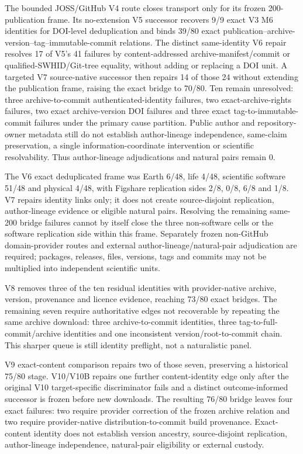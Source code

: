 The bounded JOSS/GitHub V4 route closes transport only for its frozen
200-publication frame. Its no-extension V5 successor recovers 9/9 exact V3 M6
identities for DOI-level deduplication and binds 39/80 exact
publication--archive-version--tag--immutable-commit relations. The distinct
same-identity V6 repair resolves 17 of V5's 41 failures by content-addressed
archive-manifest/commit or qualified-SWHID/Git-tree equality, without adding or
replacing a DOI unit. A targeted V7 source-native successor then repairs 14 of
those 24 without extending the publication frame, raising the exact bridge to
70/80. Ten remain unresolved: three archive-to-commit authenticated-identity
failures, two exact-archive-rights failures, two exact archive-version DOI
failures and three exact tag-to-immutable-commit failures under the primary
cause partition. Public author and repository-owner metadata still do not
establish author-lineage independence, same-claim preservation, a single
information-coordinate intervention or scientific resolvability. Thus
author-lineage adjudications and natural pairs remain 0.

The V6 exact deduplicated frame was Earth 6/48, life 4/48, scientific software
51/48 and physical 4/48, with Figshare replication sides 2/8, 0/8, 6/8 and
1/8. V7 repairs identity links only; it does not create source-disjoint
replication, author-lineage evidence or eligible natural pairs. Resolving the
remaining same-200 bridge failures cannot by itself close the three
non-software cells or the software replication side within this frame.
Separately frozen non-GitHub domain-provider
routes and external author-lineage/natural-pair adjudication are required;
packages, releases, files, versions, tags and commits may not be multiplied
into independent scientific units.

V8 removes three of the ten residual identities with provider-native archive,
version, provenance and licence evidence, reaching 73/80 exact bridges. The
remaining seven require authoritative edges not recoverable by repeating the
same archive download: three archive-to-commit identities, three tag-to-full-
commit/archive identities and one inconsistent version/root-to-commit chain.
This sharper queue is still identity preflight, not a naturalistic panel.

V9 exact-content comparison repairs two of those seven, preserving a historical
75/80 stage.  V10/V10B repairs one further content-identity edge only after the
original V10 target-specific discriminator fails and a distinct outcome-informed
successor is frozen before new downloads.  The resulting 76/80 bridge leaves
four exact failures: two require provider correction of the frozen archive
relation and two require provider-native distribution-to-commit build
provenance.  Exact-content identity does not establish version ancestry,
source-disjoint replication, author-lineage independence, natural-pair
eligibility or external custody.

